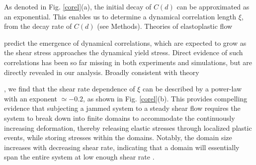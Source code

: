 \documentclass[%
preprint,
 amsmath,amssymb,
 aps,
]{revtex4-1}
\begin{document}
As denoted in Fig. \ref{corel}(a), the initial decay of $C(d)$ can be approximated as an exponential. This enables us to determine a dynamical correlation length $\xi$, from the decay rate of $C(d)$ (see Methods). Theories of elastoplastic flow {\cite{picard2002simple,bocquet2009kinetic,nicolas2018deformation,ferrero2014relaxation,lin2018microscopic,benzi2021continuum} predict the emergence of dynamical correlations, which are expected to grow as the shear stress approaches the dynamical yield stress. Direct evidence of such correlations has been so far missing in both experiments and simulations, but are directly revealed in our analysis. Broadly consistent with theory {\cite{clemmer2021criticality,clemmer2021criticality1,lin2014scaling}, we find that the shear rate dependence of $\xi$ can be described by a power-law with an exponent $\simeq -0.2$, as shown in Fig. \ref{corel}(b). 
This provides compelling evidence that subjecting a jammed system to a steady shear flow requires the system to break down into finite domains to accommodate the continuously increasing deformation, thereby releasing elastic stresses through localized plastic events, while storing stresses within the domains.  Notably, the domain size increases with decreasing shear rate, indicating that a domain will essentially span the entire system at low enough shear rate \cite{nicolas2018deformation}. 




}}
\end{document}
